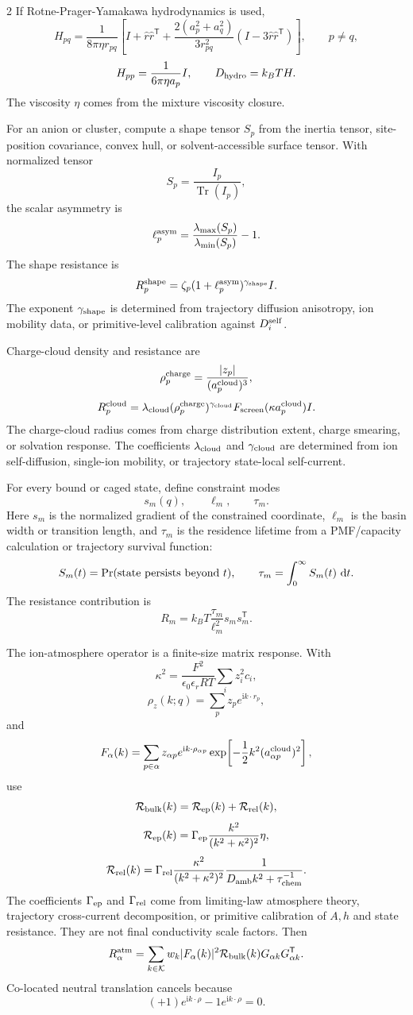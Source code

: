 \documentclass[10pt]{article}
\newcommand{\dd}{\,\mathrm d}
\newcommand{\T}{\mathsf{T}}
\begin{document}
\begin{multicols}{2}
If Rotne-Prager-Yamakawa hydrodynamics is used,
\[
H_{pq}
=
\frac{1}{8\pi\eta r_{pq}}
\left[
I+\hat r\hat r^\T
+
\frac{2(a_p^2+a_q^2)}{3r_{pq}^2}
(I-3\hat r\hat r^\T)
\right],
\qquad p\ne q,
\]
\[
H_{pp}=\frac{1}{6\pi\eta a_p}I,
\qquad
D_{\rm hydro}=k_BTH.
\]
The viscosity \(\eta\) comes from the mixture viscosity closure.

For an anion or cluster, compute a shape tensor \(S_p\) from the inertia tensor,
site-position covariance, convex hull, or solvent-accessible surface tensor.
With normalized tensor
\[
S_p=\frac{I_p}{\operatorname{Tr}(I_p)},
\]
the scalar asymmetry is
\[
\ell_p^{\rm asym}
=
\frac{\lambda_{\max}(S_p)}{\lambda_{\min}(S_p)}-1.
\]
The shape resistance is
\[
R_p^{\rm shape}
=
\zeta_p(1+\ell_p^{\rm asym})^{\gamma_{\rm shape}}I.
\]
The exponent \(\gamma_{\rm shape}\) is determined from trajectory diffusion
anisotropy, ion mobility data, or primitive-level calibration against
\(D_i^{\rm self}\).

Charge-cloud density and resistance are
\[
\rho_p^{\rm charge}=\frac{|z_p|}{(a_p^{\rm cloud})^3},
\]
\[
R_p^{\rm cloud}
=
\lambda_{\rm cloud}
(\rho_p^{\rm charge})^{\gamma_{\rm cloud}}
F_{\rm screen}(\kappa a_p^{\rm cloud})I.
\]
The charge-cloud radius comes from charge distribution extent, charge smearing,
or solvation response. The coefficients \(\lambda_{\rm cloud}\) and
\(\gamma_{\rm cloud}\) are determined from ion self-diffusion, single-ion
mobility, or trajectory state-local self-current.

For every bound or caged state, define constraint modes
\[
s_m(q),\qquad \ell_m,\qquad \tau_m.
\]
Here \(s_m\) is the normalized gradient of the constrained coordinate,
\(\ell_m\) is the basin width or transition length, and \(\tau_m\) is the
residence lifetime from a PMF/capacity calculation or trajectory survival
function:
\[
S_m(t)=\Pr({\rm state\ persists\ beyond}\ t),
\qquad
\tau_m=\int_0^\infty S_m(t)\,\dd t.
\]
The resistance contribution is
\[
R_m=k_BT\frac{\tau_m}{\ell_m^2}s_ms_m^\T.
\]

The ion-atmosphere operator is a finite-size matrix response. With
\[
\kappa^2=
\frac{F^2}{\epsilon_0\epsilon_rRT}
\sum_i z_i^2c_i,
\]
\[
\rho_z(k;q)=\sum_pz_pe^{\mathrm i k\cdot r_p},
\]
and
\[
F_\alpha(k)
=
\sum_{p\in\alpha}
z_{\alpha p}
e^{\mathrm i k\cdot\rho_{\alpha p}}
\exp\!\left[-\frac12k^2(a_{\alpha p}^{\rm cloud})^2\right],
\]
use
\[
\mathcal R_{\rm bulk}(k)=
\mathcal R_{\rm ep}(k)+\mathcal R_{\rm rel}(k),
\]
\[
\mathcal R_{\rm ep}(k)=
\Gamma_{\rm ep}\frac{k^2}{(k^2+\kappa^2)^2}\eta,
\]
\[
\mathcal R_{\rm rel}(k)=
\Gamma_{\rm rel}
\frac{\kappa^2}{(k^2+\kappa^2)^2}
\frac{1}{D_{\rm amb}k^2+\tau_{\rm chem}^{-1}}.
\]
The coefficients \(\Gamma_{\rm ep}\) and \(\Gamma_{\rm rel}\) come from
limiting-law atmosphere theory, trajectory cross-current decomposition, or
primitive calibration of \(A,h\) and state resistance. They are not final
conductivity scale factors. Then
\[
R_\alpha^{\rm atm}
=
\sum_{k\in\mathcal K}
w_k|F_\alpha(k)|^2
\mathcal R_{\rm bulk}(k)
G_{\alpha k}G_{\alpha k}^\T.
\]
Co-located neutral translation cancels because
\[
(+1)e^{\mathrm i k\cdot\rho}-1e^{\mathrm i k\cdot\rho}=0.
\]


\end{multicols}
\end{document}
